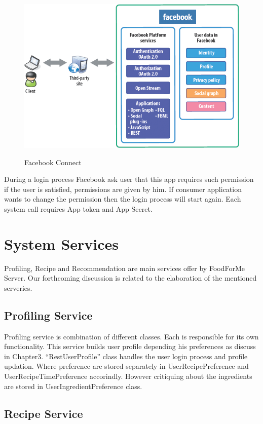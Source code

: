 	\begin{figure}[h]
		\centering
		\includegraphics[width=.68\linewidth]{figures/ch4_facebook_connect.png}
		\caption{Facebook Connect}
		\label{fig:ch4_facebook_connect}
		\cite{ko2010social}
	\end{figure}
	
\newpage
 During a login process Facebook ask user that this app requires such permission if the user is satisfied, permissions are given by him. If consumer application wants to change the permission then the login process will start again. Each system call requires App token and App Secret. 


		
\section{System Services}

Profiling, Recipe and Recommendation are main services offer by FoodForMe Server. Our forthcoming discussion is related to the elaboration of the mentioned serveries. 

\subsection{Profiling Service}

Profiling service is combination of different classes. Each is responsible for its own functionality. This service builds user profile depending his preferences as discuss in Chapter3. “RestUserProfile” class handles the user login process and profile updation. Where preference are stored separately in UserRecipePreference and UserRecipeTimePreference accorindly. However critiquing about the ingredients are stored in UserIngredientPreference class. 

\subsection{Recipe Service}

